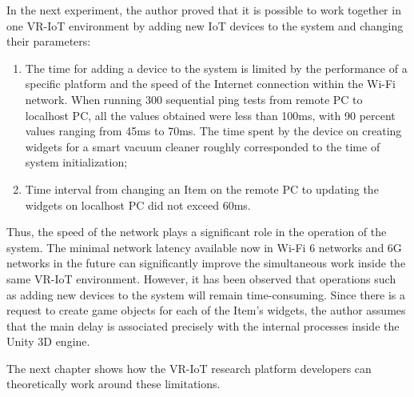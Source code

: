 In the next experiment, the author proved that it is possible to work together in one VR-IoT environment by adding new IoT devices to the system and changing their parameters:
\begin{enumerate}
    \item The time for adding a device to the system is limited by the performance of a specific platform and the speed of the Internet connection within the Wi-Fi network. When running 300 sequential ping tests from remote PC to localhost PC, all the values ​​obtained were less than 100ms, with 90 percent values ​​ranging from 45ms to 70ms. The time spent by the device on creating widgets for a smart vacuum cleaner roughly corresponded to the time of system initialization;
    \item Time interval from changing an Item on the remote PC to updating the widgets on localhost PC did not exceed 60ms.
\end{enumerate}

Thus, the speed of the network plays a significant role in the operation of the system. The minimal network latency available now in Wi-Fi 6 networks and 6G networks in the future can significantly improve the simultaneous work inside the same VR-IoT environment. However, it has been observed that operations such as adding new devices to the system will remain time-consuming. Since there is a request to create game objects for each of the Item's widgets, the author assumes that the main delay is associated precisely with the internal processes inside the Unity 3D engine.

The next chapter shows how the VR-IoT research platform developers can theoretically work around these limitations.